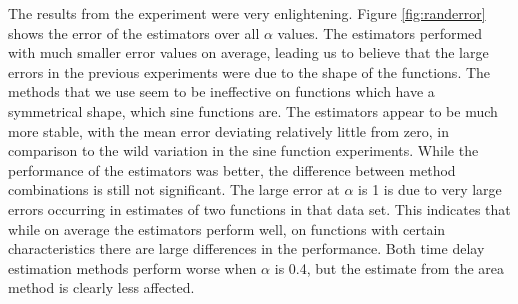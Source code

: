 \documentclass[a4paper,11pt]{article}
\begin{document}
    The results from the experiment were very enlightening. Figure
    \ref{fig:randerror} shows the error of the estimators over all $\alpha$
    values. The estimators performed with much smaller error values on average,
    leading us to believe that the large errors in the previous experiments were due
    to the shape of the functions. The methods that we use seem to be ineffective on
    functions which have a symmetrical shape, which sine functions are. The
    estimators appear to be much more stable, with the mean error deviating
    relatively little from zero, in comparison to the wild variation in the sine
    function experiments. While the performance of the estimators was better, the
    difference between method combinations is still not significant. The large error
    at $\alpha$ is 1 is due to very large errors occurring in estimates of two
    functions in that data set. This indicates that while on average the estimators
    perform well, on functions with certain characteristics there are large
    differences in the performance. Both time delay estimation methods perform worse
    when $\alpha$ is 0.4, but the estimate from the area method is clearly less
    affected.
\end{document}
